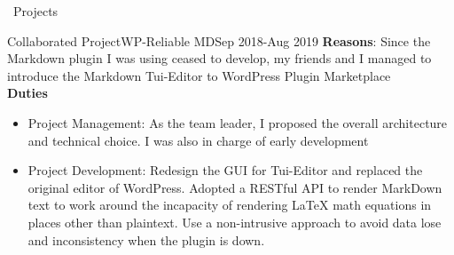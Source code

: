 \documentclass{resume}
\begin{document}
\begin{rSection}{\faUsers~Projects}
    \begin{rProject}{Collaborated Project}{WP-Reliable MD}{Sep 2018-Aug 2019}
        \textbf{Reasons}: Since the Markdown plugin I was using ceased to develop, my friends and I managed to introduce the Markdown Tui-Editor to WordPress Plugin Marketplace\\
        \textbf{Duties}
        \begin{itemize}
            \itemsep -0.5em \vspace{-0.5em}
            \item Project Management: As the team leader, I proposed the overall architecture and technical choice. I was also in charge of early development
            \item Project Development: Redesign the GUI for Tui-Editor and replaced the original editor of WordPress. Adopted a RESTful API to render MarkDown text to work around the incapacity of rendering LaTeX math equations in places other than plaintext. Use a non-intrusive approach to avoid data lose and inconsistency when the plugin is down.
        \end{itemize}
    \end{rProject}






\end{rSection}
\end{document}
